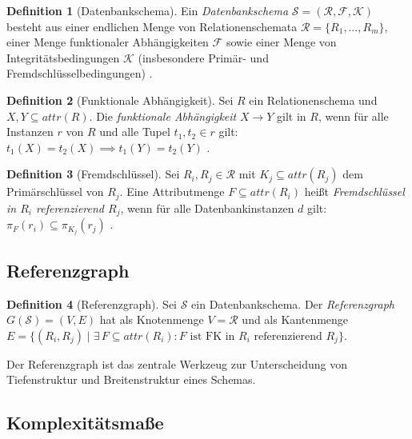 ﻿\documentclass[12pt,a4paper]{article}
\theoremstyle{definition}
\newtheorem{definition}{Definition}[section]
\theoremstyle{remark}
\newcommand{\att}{\mathit{attr}}
\begin{document}
\begin{definition}[Datenbankschema]
Ein \emph{Datenbankschema} $\mathcal{S} = (\mathcal{R}, \mathcal{F}, \mathcal{K})$
besteht aus einer endlichen Menge von Relationenschemata $\mathcal{R} = \{R_1, \ldots, R_m\}$,
einer Menge funktionaler Abhängigkeiten $\mathcal{F}$ sowie einer Menge von
Integritätsbedingungen $\mathcal{K}$ (insbesondere Primär- und Fremdschlüsselbedingungen)
\cite{Ullman1988}.
\end{definition}

\begin{definition}[Funktionale Abhängigkeit]
Sei $R$ ein Relationenschema und $X, Y \subseteq \att(R)$.
Die \emph{funktionale Abhängigkeit} $X \to Y$ gilt in $R$, wenn für alle
Instanzen $r$ von $R$ und alle Tupel $t_1, t_2 \in r$ gilt:
$t_1(X) = t_2(X) \implies t_1(Y) = t_2(Y)$ \cite{Armstrong1974}.
\end{definition}

\begin{definition}[Fremdschlüssel]
Sei $R_i, R_j \in \mathcal{R}$ mit $K_j \subseteq \att(R_j)$ dem Primärschlüssel
von $R_j$. Eine Attributmenge $F \subseteq \att(R_i)$ heißt
\emph{Fremdschlüssel in $R_i$ referenzierend $R_j$}, wenn für alle Datenbankinstanzen
$d$ gilt: $\pi_F(r_i) \subseteq \pi_{K_j}(r_j)$ \cite{Date2003}.
\end{definition}

\subsection{Referenzgraph}

\begin{definition}[Referenzgraph]
\label{def:refgraph}
Sei $\mathcal{S}$ ein Datenbankschema. Der \emph{Referenzgraph}
$G(\mathcal{S}) = (V, E)$ hat als Knotenmenge $V = \mathcal{R}$ und als
Kantenmenge $E = \{(R_i, R_j) \mid \exists\, F \subseteq \att(R_i)\colon
F \text{ ist FK in } R_i \text{ referenzierend } R_j\}$.
\end{definition}

Der Referenzgraph ist das zentrale Werkzeug zur Unterscheidung von
Tiefenstruktur und Breitenstruktur eines Schemas.

\subsection{Komplexitätsmaße}
\end{document}

